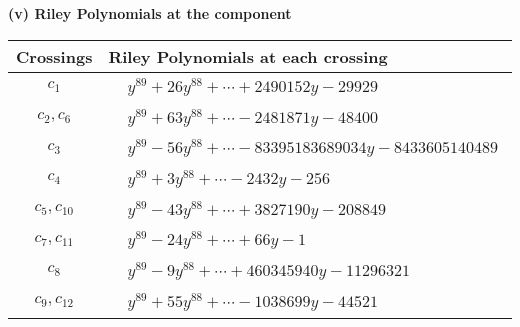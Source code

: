\documentclass[1p]{elsarticle_modified}
\theoremstyle{definition}
\begin{document}
\newpage\renewcommand{\arraystretch}{1}
\flushleft \textbf{(v) Riley Polynomials at the component}\newline \\
\begin{tabular}{m{50pt}|m{274pt}}
Crossings & \hspace{64pt}Riley Polynomials at each crossing \\
\hline $$\begin{aligned}c_{1}\end{aligned}$$&$\begin{aligned}
&y^{89}+26 y^{88}+\cdots+2490152 y-29929
\end{aligned}$\\
\hline $$\begin{aligned}c_{2},c_{6}\end{aligned}$$&$\begin{aligned}
&y^{89}+63 y^{88}+\cdots-2481871 y-48400
\end{aligned}$\\
\hline $$\begin{aligned}c_{3}\end{aligned}$$&$\begin{aligned}
&y^{89}-56 y^{88}+\cdots-83395183689034 y-8433605140489
\end{aligned}$\\
\hline $$\begin{aligned}c_{4}\end{aligned}$$&$\begin{aligned}
&y^{89}+3 y^{88}+\cdots-2432 y-256
\end{aligned}$\\
\hline $$\begin{aligned}c_{5},c_{10}\end{aligned}$$&$\begin{aligned}
&y^{89}-43 y^{88}+\cdots+3827190 y-208849
\end{aligned}$\\
\hline $$\begin{aligned}c_{7},c_{11}\end{aligned}$$&$\begin{aligned}
&y^{89}-24 y^{88}+\cdots+66 y-1
\end{aligned}$\\
\hline $$\begin{aligned}c_{8}\end{aligned}$$&$\begin{aligned}
&y^{89}-9 y^{88}+\cdots+460345940 y-11296321
\end{aligned}$\\
\hline $$\begin{aligned}c_{9},c_{12}\end{aligned}$$&$\begin{aligned}
&y^{89}+55 y^{88}+\cdots-1038699 y-44521
\end{aligned}$\\
\hline
\end{tabular}\\~\\
\end{document}
